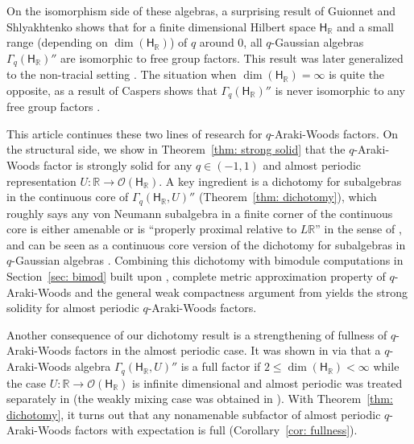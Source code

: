 \documentclass[a4paper,11pt]{amsart}
\theoremstyle{definition}
\newcommand{\R}{{\mathbb R}}
\newcommand{\cO}{{\mathcal O}}
\newcommand{\sH}{\mathsf{H}}
\begin{document}
On the isomorphism side of these algebras, a surprising result of Guionnet and Shlyakhtenko \cite{GuSh14}
	shows that for a finite dimensional Hilbert space $\sH_\R$ 
	and a small range (depending on $\dim(\sH_\R)$) of $q$ around $0$,
	all $q$-Gaussian algebras $\Gamma_q(\sH_\R)''$ are isomorphic to free group factors.
This result was later generalized to the non-tracial setting \cite{Nel15}.
The situation when $\dim(\sH_\R)=\infty$ is quite the opposite, as a result of Caspers shows that $\Gamma_q(\sH_\R)''$ is never isomorphic 
	to any free group factors \cite{Cas23}.

This article continues these two lines of research for $q$-Araki-Woods factors. 
On the structural side, we show in Theorem~\ref{thm: strong solid} that the $q$-Araki-Woods factor is strongly solid
	for any $q\in(-1,1)$ and almost periodic representation $U:\R\to \cO(\sH_\R)$.
A key ingredient is a dichotomy for subalgebras in the continuous core of $\Gamma_q(\sH_\R, U)''$ (Theorem~\ref{thm: dichotomy}),
	which roughly says any von Neumann subalgebra in a finite corner of the continuous core is either amenable
	or is ``properly proximal relative to $L\R$'' in the sense of \cite{DKEP22},
	and can be seen as a continuous core version of the dichotomy for subalgebras in $q$-Gaussian algebras \cite[Theorem 8.1]{DP23}.
Combining this dichotomy with bimodule computations in Section~\ref{sec: bimod} built upon \cite{Av11, Wil20},
	complete metric approximation property of $q$-Araki-Woods \cite{ABW18}
	and the general weak compactness argument from \cite{BHV18}
	yields the strong solidity for almost periodic $q$-Araki-Woods factors.
	
Another consequence of our dichotomy result is a strengthening of fullness of $q$-Araki-Woods factors in the almost periodic case.
It was shown in \cite{KSW23} via \cite{Nel17} that a $q$-Araki-Woods algebra $\Gamma_q(\sH_\R, U)''$ is a full factor
	if $2\leq \dim(\sH_\R)<\infty$
	while the case $U: \R\to \cO(\sH_\R)$ is infinite dimensional and almost periodic was treated separately in \cite{KW24}
	(the weakly mixing case was obtained in \cite{HoIs20}).
With Theorem~\ref{thm: dichotomy}, it turns out that any nonamenable subfactor of almost periodic $q$-Araki-Woods factors
	with expectation is full (Corollary~\ref{cor: fullness}).
	
\end{document}
